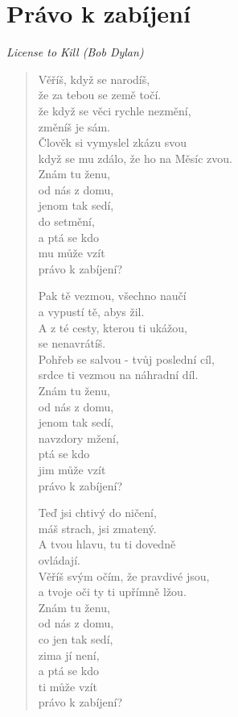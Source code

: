 \section*{Právo k zabíjení}

\textit{License to Kill (Bob Dylan)}

\begin{verse}
 Věříš, když se narodíš,\\ 
 že za tebou se země točí.\\
 že když se věci rychle nezmění, \\
 změníš je sám.\\
 Člověk si vymyslel zkázu svou\\
 když se mu zdálo, že ho na Měsíc zvou.\\
 Znám tu ženu,\\
 od nás z domu,\\
 jenom tak sedí,\\
 do setmění,\\
 a ptá se kdo \\
 mu může vzít \\
 právo k zabíjení?
 
 Pak tě vezmou, všechno naučí \\
 a vypustí tě, abys žil. \\
 A z té cesty, kterou ti ukážou,  \\
 se nenavrátíš. \\
 Pohřeb se salvou - tvůj poslední cíl, \\
 srdce ti vezmou na náhradní díl. \\
 Znám tu ženu, \\
 od nás z domu, \\
 jenom tak sedí, \\
 navzdory mžení, \\
 ptá se kdo \\
 jim může vzít \\
 právo k zabíjení?
 
 Teď jsi chtivý do ničení, \\
 máš strach, jsi zmatený. \\
 A tvou hlavu, tu ti dovedně \\
 ovládají. \\
 Věříš svým očím, že pravdivé jsou, \\
 a tvoje oči ty ti upřímně lžou. \\
 Znám tu ženu, \\
 od nás z domu, \\
 co jen tak sedí, \\
 zima jí není, \\
 a ptá se kdo \\
 ti může vzít \\
 právo k zabíjení?
 

\end{verse}

